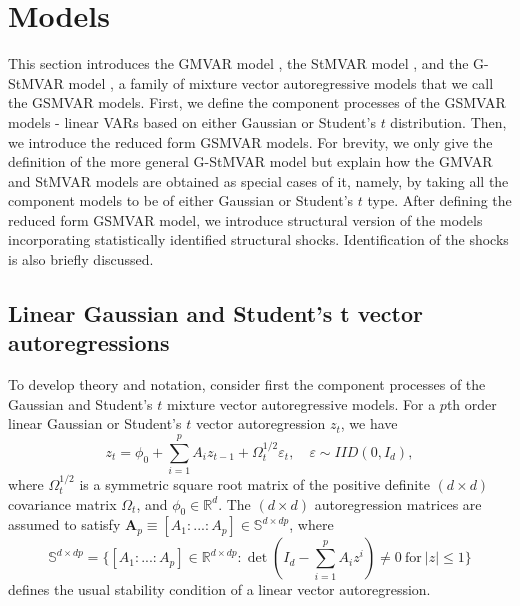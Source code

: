 \documentclass[nojss]{jss}
\begin{document}
\section{Models}\label{sec:models}


This section introduces the GMVAR model \citep{Kalliovirta+Meitz+Saikkonen:2016}, the StMVAR model \citep{Virolainen2:2021}, and the G-StMVAR model \citep{Virolainen2:2021}, a family of mixture vector autoregressive models that we call the GSMVAR models. First, we define the component processes of the GSMVAR models - linear VARs based on either Gaussian or Student's $t$ distribution. Then, we introduce the reduced form GSMVAR models. For brevity, we only give the definition of the more general G-StMVAR model but explain how the GMVAR and StMVAR models are obtained as special cases of it, namely, by taking all the component models to be of either Gaussian or Student's $t$ type. After defining the reduced form GSMVAR model, we introduce structural version of the models incorporating statistically identified structural shocks. Identification of the shocks is also briefly discussed.

\subsection{Linear Gaussian and Student's t vector autoregressions}\label{sec:linvar}

To develop theory and notation, consider first the component processes of the Gaussian and Student's $t$ mixture vector autoregressive models. For a $p$th order linear Gaussian or Student's $t$ vector autoregression $z_t$, we have
\begin{equation}\label{eq:gaussianvar}
z_t = \phi_{0} + \sum_{i=1}^pA_iz_{t-1} + \Omega_t^{1/2}\varepsilon_t, \quad \varepsilon\sim IID(0,I_d),
\end{equation}
where $\Omega_t^{1/2}$ is a symmetric square root matrix of the positive definite $(d\times d)$ covariance matrix $\Omega_t$, and $\phi_0\in\mathbb{R}^d$. The $(d \times d)$ autoregression matrices are assumed to satisfy $\boldsymbol{A}_p \equiv [A_1:...:A_p]\in\mathbb{S}^{d\times dp}$, where
\begin{equation}\label{eq:statreg}
\mathbb{S}^{d\times dp}= \lbrace [A_1:...:A_p]\in\mathbb{R}^{d\times dp}: \det(I_d - \sum_{i=1}^pA_iz^i)\neq 0 \ \text{for} \ |z|\leq 1 \rbrace
\end{equation}
defines the usual stability condition of a linear vector autoregression.
\end{document}
